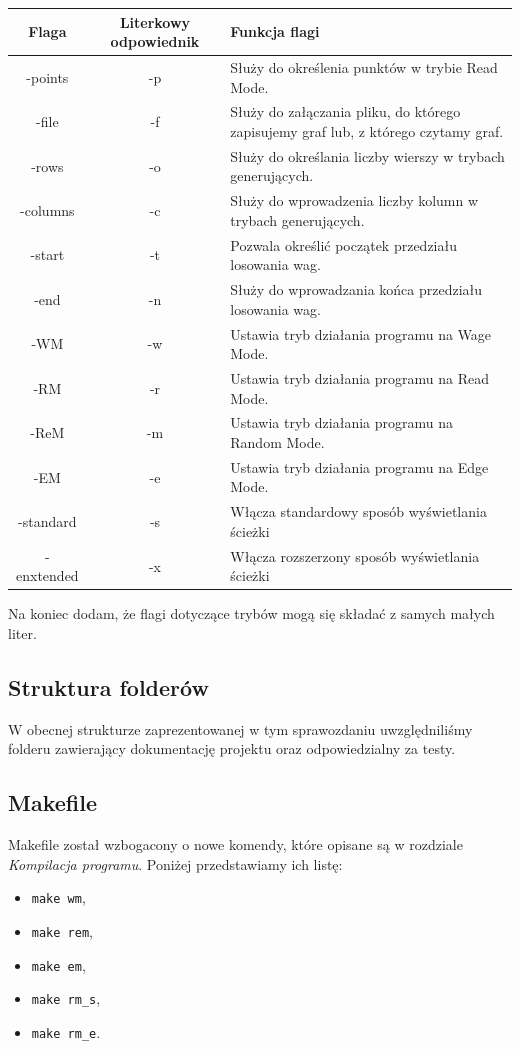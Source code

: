 \documentclass[10pt, a4paper]{report}
\begin{document}
    \begin{tabularx}{\textwidth}{ c|c|X }
        \hline Flaga & Literkowy odpowiednik & Funkcja flagi \\
        \hline -points & -p & Służy do określenia punktów w trybie Read Mode.\\
        \hline -file & -f & Służy do załączania pliku, do którego zapisujemy graf lub, z którego czytamy graf.\\
        \hline -rows & -o & Służy do określania liczby wierszy w trybach generujących.\\
        \hline -columns & -c & Służy do wprowadzenia liczby kolumn w trybach generujących.\\
        \hline -start & -t & Pozwala określić początek przedziału losowania wag.\\
        \hline -end & -n & Służy do wprowadzania końca przedziału losowania wag.\\
        \hline -WM & -w & Ustawia tryb działania programu na Wage Mode.\\
        \hline -RM & -r & Ustawia tryb działania programu na Read Mode.\\
        \hline -ReM & -m & Ustawia tryb działania programu na Random Mode.\\
        \hline -EM & -e & Ustawia tryb działania programu na Edge Mode.\\
        \hline -standard & -s & Włącza standardowy sposób wyświetlania ścieżki\\
        \hline -enxtended & -x & Włącza rozszerzony sposób wyświetlania ścieżki\\
        \hline
    \end{tabularx}
    \newline\newline Na koniec dodam, że flagi dotyczące trybów mogą się składać z samych małych liter.

    \subsection{Struktura folderów}
    W obecnej strukturze zaprezentowanej w tym sprawozdaniu uwzględniliśmy folderu zawierający dokumentację projektu oraz odpowiedzialny za testy.

    \subsection{Makefile}
    Makefile został wzbogacony o nowe komendy, które opisane są w rozdziale \textit{Kompilacja programu}. Poniżej przedstawiamy ich listę:
    \begin{itemize}
        \item \texttt{make wm},
        \item \texttt{make rem},
        \item \texttt{make em},
        \item \texttt{make rm\_s},
        \item \texttt{make rm\_e}.
    \end{itemize}   
    
\end{document}

